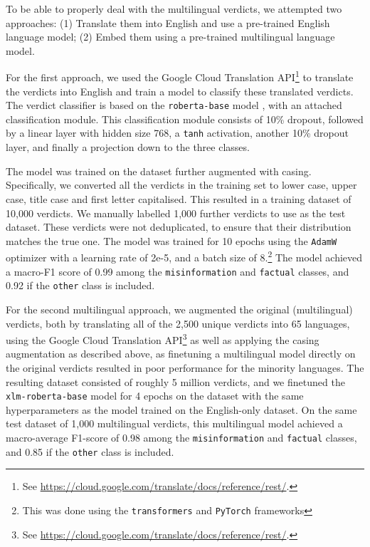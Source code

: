 \documentclass[sigconf,natbib=true,anonymous=false,nonacm]{acmart}
\begin{document}
To be able to properly deal with the multilingual verdicts, we attempted two
approaches: (1) Translate them into English and use a pre-trained English
language model; (2) Embed them using a pre-trained multilingual language model.

For the first approach, we used the Google Cloud Translation API\footnote{See
\url{https://cloud.google.com/translate/docs/reference/rest/}.} to translate
the verdicts into English and train a model to classify these translated
verdicts. The verdict classifier is based on the \texttt{roberta-base} model
\citep{liu2019roberta}, with an attached classification module. This
classification module consists of 10\% dropout, followed by a linear layer with
hidden size 768, a \texttt{tanh} activation, another 10\% dropout layer, and
finally a projection down to the three classes.

The model was trained on the dataset further augmented with casing.
Specifically, we converted all the verdicts in the training set to lower case,
upper case, title case and first letter capitalised. This resulted in a
training dataset of 10,000 verdicts. We manually labelled 1,000 further
verdicts to use as the test dataset. These verdicts were not deduplicated, to
ensure that their distribution matches the true one. The model was trained for
10 epochs using the \texttt{AdamW} optimizer \citep{loshchilov2017decoupled}
with a learning rate of 2e-5, and a batch size of 8.\footnote{This was done
using the \texttt{transformers} \citep{wolf2020transformers} and
\texttt{PyTorch} \citep{paszke2019pytorch} frameworks} The model achieved
a macro-F1 score of 0.99 among the \texttt{misinformation} and
\texttt{factual} classes, and 0.92 if the \texttt{other} class is included.

For the second multilingual approach, we augmented the original (multilingual)
verdicts, both by translating all of the 2,500 unique verdicts into 65
languages, using the Google Cloud Translation API\footnote{See
\url{https://cloud.google.com/translate/docs/reference/rest/}.} as well as
applying the casing augmentation as described above, as finetuning a
multilingual model directly on the original verdicts resulted in poor
performance for the minority languages. The resulting dataset consisted of
roughly 5 million verdicts, and we finetuned the \texttt{xlm-roberta-base}
model \cite{conneau2020unsupervised} for 4 epochs on the dataset with the same
hyperparameters as the model trained on the English-only dataset. On the same
test dataset of 1,000 multilingual verdicts, this multilingual model
achieved a macro-average F1-score of 0.98 among the \texttt{misinformation} and
\texttt{factual} classes, and 0.85 if the \texttt{other} class is included.
\end{document}
